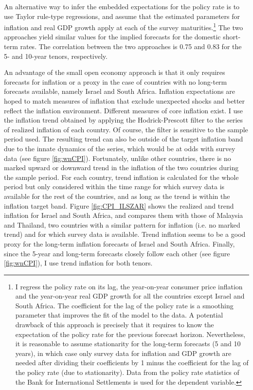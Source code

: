 {%
An alternative way to infer the embedded expectations for the policy rate is to use Taylor rule-type regressions, and assume that the estimated parameters for inflation and real GDP growth apply at each of the survey maturities.\footnote{ I regress the policy rate on its lag, the year-on-year consumer price inflation and the year-on-year real GDP growth for all the countries except Israel and South Africa. The coefficient for the lag of the policy rate is a smoothing parameter that improves the fit of the model to the data. A potential drawback of this approach is precisely that it requires to know the expectation of the policy rate for the previous forecast horizon. Nevertheless, it is reasonable to assume stationarity for the long-term forecasts (5 and 10 years), in which case only survey data for inflation and GDP growth are needed after dividing their coefficients by 1 minus the coefficient for the lag of the policy rate (due to stationarity). Data from the policy rate statistics of the Bank for International Settlements is used for the dependent variable.}
The two approaches yield similar values for the implied forecasts for the domestic short-term rates. 
The correlation  between the two approaches is 0.75 and 0.83 for the 5- and 10-year tenors, respectively.

An advantage of the small open economy approach is that it only requires forecasts for inflation or a proxy in the case of countries with no long-term forecasts available, namely Israel and South Africa.
Inflation expectations are hoped to match measures of inflation that exclude unexpected shocks and better reflect the inflation environment.
Different measures of core inflation exist.
I use the inflation trend obtained by applying the Hodrick-Prescott filter to the series of realized inflation of each country.
Of course, the filter is sensitive to the sample period used.
The resulting trend can also be outside of the target inflation band due to the innate dynamics of the series, which would be at odds with survey data (see figure \ref{fig:wnCPI}).
Fortunately, unlike other countries, there is no marked upward or downward trend in the inflation of the two countries during the sample period.
For each country, trend inflation is calculated for the whole period but only considered within the time range for which survey data is available for the rest of the countries, and as long as the trend is within the inflation target band.
Figure \ref{fig:CPI_ILSZAR} shows the realized and trend inflation for Israel and South Africa, and compares them with those of Malaysia and Thailand, two countries with a similar pattern for inflation (i.e. no marked trend) and for which survey data is available.
Trend inflation seems to be a good proxy for the long-term inflation forecasts of Israel and South Africa.
Finally, since the 5-year and long-term forecasts closely follow each other (see figure \ref{fig:wnCPI}), I use trend inflation for both tenors.

}
